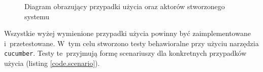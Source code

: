 \begin{figure}[hbt]
\centering
{}
\caption{Diagram obrazujący przypadki użycia oraz aktorów stworzonego systemu}
\label{usecase}
\end{figure}

Wszystkie wyżej wymienione przypadki użycia powinny być zaimplementowane i~przetestowane. W~tym celu stworzono testy behawioralne przy użyciu narzędzia \texttt{cucumber}. Testy te~przyjmują formę scenariuszy dla konkretnych przypadków użycia (listing \ref{code.scenario}).

